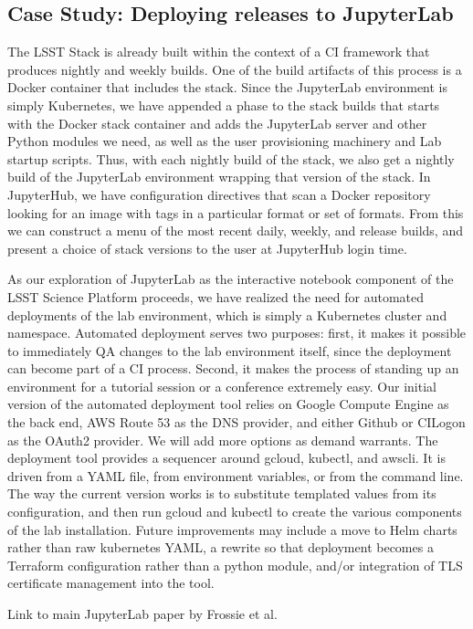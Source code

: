 \subsection{Case Study: Deploying releases to JupyterLab}

The LSST Stack is already built within the context of a CI framework
that produces nightly and weekly builds.  One of the build artifacts of
this process is a Docker container that includes the stack.  Since the
JupyterLab environment is simply Kubernetes, we have appended a phase to
the stack builds that starts with the Docker stack container and adds
the JupyterLab server and other Python modules we need, as well as the
user provisioning machinery and Lab startup scripts.  Thus, with each
nightly build of the stack, we also get a nightly build of the
JupyterLab environment wrapping that version of the stack.  In
JupyterHub, we have configuration directives that scan a Docker
repository looking for an image with tags in a particular format or set
of formats.  From this we can construct a menu of the most recent daily,
weekly, and release builds, and present a choice of stack versions to
the user at JupyterHub login time.

As our exploration of JupyterLab as the interactive notebook component
of the LSST Science Platform\cite{LSE-319} proceeds, we have realized the need for
automated deployments of the lab environment, which is simply a
Kubernetes cluster and namespace.  Automated deployment serves two
purposes: first, it makes it possible to immediately QA changes to the
lab environment itself, since the deployment can become part of a CI
process.  Second, it makes the process of standing up an environment for
a tutorial session or a conference extremely easy.  Our initial version
of the automated deployment tool relies on Google Compute Engine as the
back end, AWS Route 53 as the DNS provider, and either Github or CILogon
as the OAuth2 provider.  We will add more options as demand warrants.
The deployment tool provides a sequencer around gcloud, kubectl, and
awscli.  It is driven from a YAML file, from environment variables, or
from the command line.  The way the current version works is to
substitute templated values from its configuration, and then run gcloud
and kubectl to create the various components of the lab installation.
Future improvements may include a move to Helm charts rather than raw
kubernetes YAML, a rewrite so that deployment becomes a Terraform
configuration rather than a python module, and/or integration of TLS
certificate management into the tool.

Link to main JupyterLab paper by Frossie et al.
